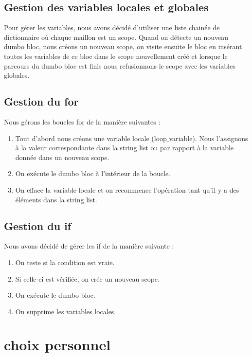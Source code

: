\documentclass[a4paper, 12pt]{article}
\begin{document}
\subsection{Gestion des variables locales et globales}
Pour gérer les variables, nous avons décidé d'utiliser une liste chainée de dictionnaire où chaque maillon est un scope. Quand on détecte un nouveau dumbo bloc, nous créons un nouveau scope, on visite ensuite le bloc en insérant toutes les variables de ce bloc dans le scope nouvellement créé et lorsque le parcours du dumbo bloc est finis nous refusionnons le scope avec les variables globales.

\subsection{Gestion du for}

Nous gérons les boucles for de la manière suivantes :\begin{enumerate}
\item Tout d'abord nous créons une variable locale (loop$\_$variable). Nous l'assignons à la valeur correspondante dans la string$\_$list ou par rapport à la variable donnée dans un nouveau scope.
\item On exécute le dumbo bloc à l'intérieur de la boucle.
\item On efface la variable locale et on recommence l'opération tant qu'il y a des éléments dans la string$\_$list.
\end{enumerate}
\subsection{Gestion du if}
Nous avons décidé de gérer les if de la manière suivante : \begin{enumerate}
\item On teste si la condition est vraie.
\item Si celle-ci est vérifiée, on crée un nouveau scope.
\item On exécute le dumbo bloc.
\item On supprime les variables locales.
\end{enumerate}

\section{choix personnel}
\end{document}
